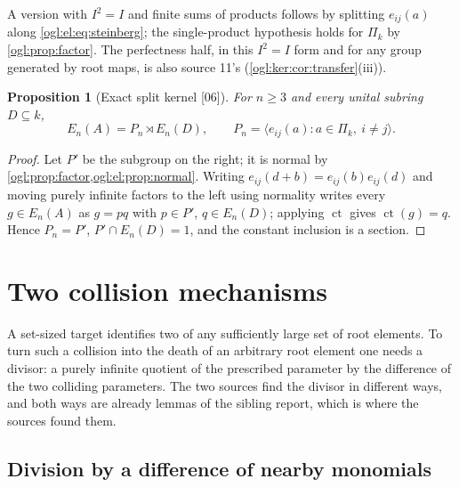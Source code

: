\documentclass[11pt,oneside]{article}
\numberwithin{equation}{section}
\newtheorem{proposition}[proposition]{Proposition}
\theoremstyle{definition}
\theoremstyle{remark}
\newcommand{\ct}{\operatorname{ct}}
\newcommand{\src}[1]{\textup{\textsf{\small[#1]}}}
\begin{document}
A version with $I^2=I$ and finite sums of products follows by splitting
$e_{ij}(a)$ along \eqref{ogl:el:eq:steinberg}; the single-product hypothesis
holds for $\Pi_k$ by \cref{ogl:prop:factor}. The perfectness half, in this
$I^2=I$ form and for any group generated by root maps, is also source 11's
(\cref{ogl:ker:cor:transfer}(iii)).

\begin{proposition}[Exact split kernel \src{06}]\label{ogl:el:prop:split}
For $n\ge3$ and every unital subring $D\subseteq k$,
\[
 E_n(A)=P_n\rtimes E_n(D),\qquad
 P_n=\langle e_{ij}(a):a\in\Pi_k,\ i\ne j\rangle .
\]
\end{proposition}
\begin{proof}
Let $P'$ be the subgroup on the right; it is normal by
\cref{ogl:prop:factor,ogl:el:prop:normal}. Writing $e_{ij}(d+b)=e_{ij}(b)e_{ij}(d)$
and moving purely infinite factors to the left using normality writes every
$g\in E_n(A)$ as $g=pq$ with $p\in P'$, $q\in E_n(D)$; applying $\ct$ gives
$\ct(g)=q$. Hence $P_n=P'$, $P'\cap E_n(D)=1$, and the constant inclusion is a
section.
\end{proof}

\section{Two collision mechanisms}\label{ogl:el:sec:collision}

A set-sized target identifies two of any sufficiently large set of root
elements. To turn such a collision into the death of an arbitrary root element
one needs a divisor: a purely infinite quotient of the prescribed parameter by
the difference of the two colliding parameters. The two sources find the
divisor in different ways, and both ways are already lemmas of the sibling
report, which is where the sources found them.

\subsection{Division by a difference of nearby monomials}
\end{document}
